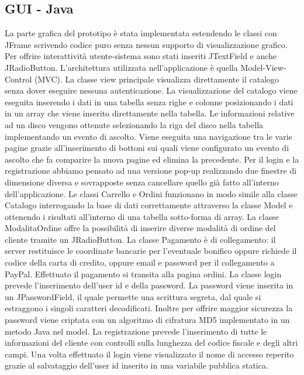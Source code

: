 \documentclass[a4paper,titlepage]{book}
\begin{document}
\subsection{GUI -  Java}
La parte grafica del prototipo \`e stata implementata estendendo le classi con JFrame scrivendo codice puro senza nessun supporto di visualizzazione grafico. Per offrire interattivit\`a utente-sistema sono stati inseriti JTextField e anche JRadioButton. L'architettura utilizzata nell'applicazione \`e quella Model-View-Control (MVC). La classe view principale visualizza direttamente il catalogo senza dover eseguire nessuna autenticazione. La visualizzazione del catalogo viene eseguita inserendo i dati in una tabella senza righe e colonne posizionando i dati in un array che viene inserito direttamente nella tabella. Le informazioni relative ad un disco vengono ottenute selezionando la riga del disco nella tabella implementando un evento di ascolto. Viene eseguita una navigazione tra le varie pagine grazie all'inserimento di bottoni sui quali viene configurato un evento di ascolto che fa comparire la nuova pagine ed elimina la precedente. Per il login e la registrazione abbiamo pensato ad una versione pop-up realizzando due finestre di dimensione diversa e sovrapposte senza cancellare quello gi\`a fatto all'interno dell'applicazione. Le classi Carrello e Ordini funzionano in modo simile alla classe Catalogo interrogando la base di dati correttamente attraverso la classe Model e ottenendo i risultati all'interno di una tabella sotto-forma di array. La classe ModalitaOrdine offre la possibilit\`a di inserire diverse modalit\`a di ordine del cliente tramite un JRadioButton. La classe Pagamento \`e di collegamento: il server restituisce le coordinate bancarie per l'eventuale bonifico oppure richiede il codice della carta di credito, oppure email e password per il collegamento a PayPal. Effettuato il pagamento si transita alla pagina ordini. La classe login prevede l'inserimento dell'user id e della password. La password viene inserita in un JPasswordField, il quale permette una scrittura segreta, dal quale si estraggono i singoli caratteri decodificati. Inoltre per offrire maggior sicurezza la password viene criptata con un algoritmo di cifratura MD5 implementato in un metodo Java nel model.
La registrazione prevede l'inserimento di tutte le informazioni del cliente con controlli sulla lunghezza del codice fiscale e degli altri campi. Una volta effettuato il login viene visualizzato il nome di accesso reperito grazie al salvataggio dell'user id inserito in una variabile pubblica statica.
\end{document}
